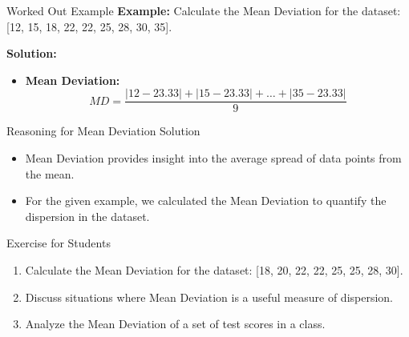 \begin{frame}{Worked Out Example}
  \textbf{Example:} Calculate the Mean Deviation for the dataset: [12, 15, 18, 22, 22, 25, 28, 30, 35].

  \textbf{Solution:}
  \begin{itemize}
    \item \textbf{Mean Deviation:} \[ MD = \frac{|12-23.33| + |15-23.33| + \ldots + |35-23.33|}{9} \]
  \end{itemize}
\end{frame}

\begin{frame}{Reasoning for Mean Deviation Solution}
  \begin{itemize}
    \item Mean Deviation provides insight into the average spread of data points from the mean.
    \item For the given example, we calculated the Mean Deviation to quantify the dispersion in the dataset.
  \end{itemize}
\end{frame}

\begin{frame}{Exercise for Students}
  \begin{enumerate}
    \item Calculate the Mean Deviation for the dataset: [18, 20, 22, 22, 25, 25, 28, 30].
    \item Discuss situations where Mean Deviation is a useful measure of dispersion.
    \item Analyze the Mean Deviation of a set of test scores in a class.
  \end{enumerate}
\end{frame}
